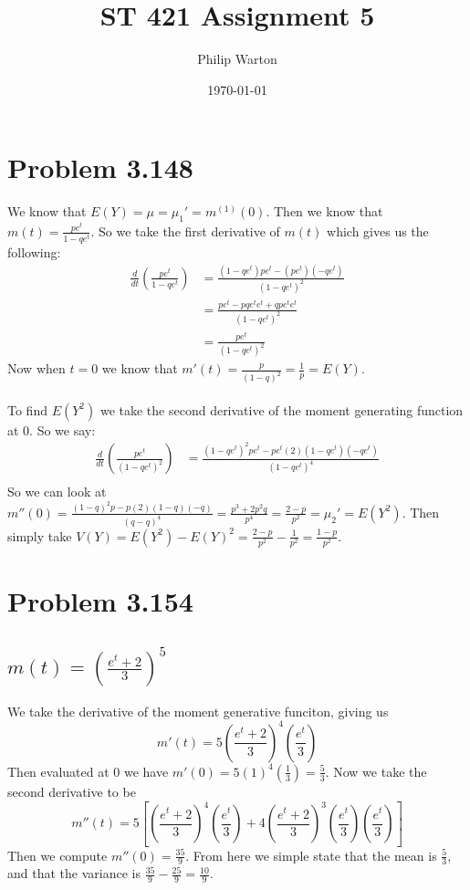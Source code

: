\documentclass{article}
\begin{document}
\title{ST 421 Assignment 5}
\author{Philip Warton}
\date{\today}
\maketitle
\section*{Problem 3.148}
    We know that $E(Y) = \mu = \mu_1' = m^{(1)}(0)$. Then we know that $m(t) = \frac{pe^t}{1-qe^t}$. So we take the first derivative of $m(t)$ which gives us the following:
    \begin{align*}
        \frac{d}{dt}\left(\frac{pe^t}{1-qe^t}\right) &= \frac{(1-qe^t)pe^t-(pe^t)(-qe^t)}{(1-qe^t)^2}\\
        &=\frac{pe^t-pqe^te^t+qpe^te^t}{(1-qe^t)^2}\\
        &=\frac{pe^t}{(1-qe^t)^2}
    \end{align*}
    Now when $t = 0$ we know that $m'(t) = \frac{p}{(1-q)^2} = \frac{1}{p} = E(Y)$.\\\\
    To find $E(Y^2)$ we take the second derivative of the moment generating function at 0. So we say:
    \begin{align*}
        \frac{d}{dt}\left(\frac{pe^t}{(1-qe^t)^2}\right)&=\frac{(1-qe^t)^2pe^t-pe^t(2)(1-qe^t)(-qe^t)}{(1-qe^t)^4}\\
    \end{align*}
    So we can look at $m''(0) = \frac{(1-q)^2p-p(2)(1-q)(-q)}{(q-q)^4} = \frac{p^3+2p^2q}{p^4} = \frac{2-p}{p^2} = \mu_2' = E(Y^2)$.
    Then simply take $V(Y) = E(Y^2) - E(Y)^2 = \frac{2-p}{p^2} - \frac{1}{p^2} = \frac{1-p}{p^2}$.
\section*{Problem 3.154}
    \subsection*{$m(t) = \left(\frac{e^t+2}{3}\right)^5$}
        We take the derivative of the moment generative funciton, giving us
        \[
            m'(t) = 5\left(\frac{e^t +2}{3}\right)^4\left(\frac{e^t}{3}\right)
        \]
        Then evaluated at 0 we have $m'(0) = 5(1)^4(\frac{1}{3}) = \frac{5}{3}$. Now we take the second derivative to be
        \[
            m''(t) = 5\left[\left(\frac{e^t+2}{3}\right)^4\left(\frac{e^t}{3}\right) + 4\left(\frac{e^t+2}{3}\right)^3\left(\frac{e^t}{3}\right)\left(\frac{e^t}{3}\right)\right]
        \]
        Then we compute $m''(0) = \frac{35}{9}$.
        From here we simple state that the mean is $\frac{5}{3}$, and that the variance is $\frac{35}{9} - \frac{25}{9} = \frac{10}{9}$.
\end{document}
